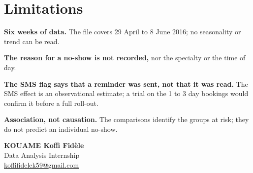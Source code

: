 \documentclass[12pt,a4paper]{article}
\begin{document}
\section{Limitations}\label{sec:limits}

\textbf{Six weeks of data.} The file covers 29 April to 8 June 2016; no seasonality or
trend can be read.

\textbf{The reason for a no-show is not recorded,} nor the specialty or the time of day.

\textbf{The SMS flag says that a reminder was sent, not that it was read.} The SMS effect
is an observational estimate; a trial on the 1 to 3 day bookings would confirm it before
a full roll-out.

\textbf{Association, not causation.} The comparisons identify the groups at risk; they do
not predict an individual no-show.

\vspace{0.1cm}
\noindent\hfill\begin{minipage}{7cm}\begin{flushright}\singlespacing
\textbf{KOUAME Koffi Fid\`ele}\\
Data Analysis Internship\\
\href{mailto:koffifidelek59@gmail.com}{koffifidelek59@gmail.com}
\end{flushright}\end{minipage}
\end{document}
